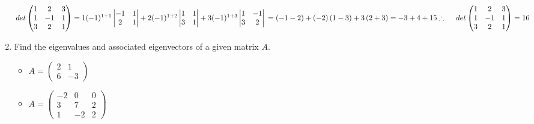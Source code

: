 \documentclass[fleqn]{article}
\begin{document}
\begin{enumerate}
        \textcolor{hwColor}{
          $
            det\begin{pmatrix}
              1 & 2 & 3
              \\
              1 & -1 & 1
              \\
              3 & 2 & 1
            \end{pmatrix}=1(-1)^{1+1} \begin{vmatrix}
              -1 & 1 
              \\
              2 & 1
            \end{vmatrix}
            +2(-1)^{1+2} \begin{vmatrix}
              1 & 1 
              \\
              3 & 1
            \end{vmatrix}
            +3 (-1)^{1+3} \begin{vmatrix}
              1 & -1 
              \\
              3 & 2
            \end{vmatrix}
            \\
            \\
            \\
            =\left(-1-2\right)+(-2)\left(1-3\right)+3\left(2+3\right)=-3+4+15
            \\
            \\
            \\
            \therefore ~~~~ det\begin{pmatrix}
              1 & 2 & 3
              \\
              1 & -1 & 1
              \\
              3 & 2 & 1
            \end{pmatrix}=16
          $
        }

    \item Find the eigenvalues and associated eigenvectors of a given matrix $A$.
    
      \begin{itemize}
        \item $A=\begin{pmatrix}
          2 & 1 
          \\
          6 & -3
        \end{pmatrix}$
        \item $A=\begin{pmatrix}
          -2 & 0 & 0 
          \\
          3 & 7 & 2 
          \\
          1 & -2 & 2
        \end{pmatrix}$
      \end{itemize}


\end{enumerate}
\end{document}
